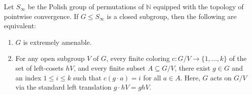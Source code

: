 \begin{proposition}
    \label{prop:coset_coloring_equiv}
    Let $S_\infty$ be the Polish group of permutations of $\mathbb{N}$ equipped with the topology of pointwise convergence. If $G \le S_\infty$ is a closed subgroup, then the following are equivalent:
    \begin{enumerate}
        \item[(i)] $G$ is extremely amenable.
        \item[(ii)] For any open subgroup $V$ of $G$, every finite coloring $c: G/V \to \{1, \dots, k\}$ of the set of left-cosets $hV$, and every finite subset $A \subseteq G/V$, there exist $g \in G$ and an index $1 \le i \le k$ such that $c(g \cdot a) = i$ for all $a \in A$. Here, $G$ acts on $G/V$ via the standard left translation $g \cdot hV = ghV$.
    \end{enumerate}
\end{proposition}


